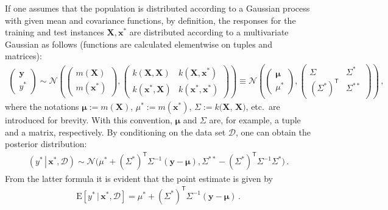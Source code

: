\documentclass[smallcondensed]{svjour3}
\begin{document}
    If one assumes that the population is distributed according to a Gaussian process with given mean and covariance functions, by definition, the responses for the training and test instances $\mathbf{X},\mathbf{x}^*$ are distributed according to a multivariate Gaussian as follows (functions are calculated elementwise on tuples and matrices):
    \begin{gather}
        \begin{pmatrix}
            \mathbf{y}\\
            y^*
        \end{pmatrix} \sim
        \mathcal{N}\left(
        \begin{pmatrix}
            m(\mathbf{X})\\
            m(\mathbf{x}^*)
        \end{pmatrix},
        \begin{pmatrix}
            k(\mathbf{X},\mathbf{X})&k(\mathbf{X},\mathbf{x}^*)\\
            k(\mathbf{x}^*,\mathbf{X})&k(\mathbf{x}^*,\mathbf{x}^*)
        \end{pmatrix}
        \right)\equiv
        \mathcal{N}\left(
            \begin{pmatrix}
            \boldsymbol{\mu}\\
            \mu^*
        \end{pmatrix},
        \begin{pmatrix}
            \Sigma&\Sigma^*\\
            (\Sigma^*)^\mathsf{T}&\Sigma^{**}
        \end{pmatrix}
        \right)\,,
    \end{gather}
    where the notations $\boldsymbol{\mu} := m(\mathbf{X})$, $\mu^* := m(\mathbf{x}^*)$, $\Sigma := k(\mathbf{X}$, $\mathbf{X})$, etc.\ are introduced for brevity. With this convention, $\boldsymbol{\mu}$ and $\Sigma$ are, for example, a tuple and a matrix, respectively. By conditioning on the data set $\mathcal{D}$, one can obtain the posterior distribution:
    \begin{gather}
        \left.\left(y^*\,\right|\,\mathbf{x}^*,\mathcal{D}\right)\sim\mathcal{N}\Big(\mu^* + (\Sigma^*)^\mathsf{T}\Sigma^{-1}(\mathbf{y}-\boldsymbol{\mu}),\Sigma^{**} - (\Sigma^*)^\mathsf{T}\Sigma^{-1}\Sigma^*\Big)\,.
    \end{gather}
    From the latter formula it is evident that the point estimate is given by
    \begin{gather}
        \mathrm{E}[y^*\,|\,\mathbf{x}^*,\mathcal{D}] = \mu^* + (\Sigma^*)^\mathsf{T}\Sigma^{-1}(\mathbf{y} - \boldsymbol{\mu})\,.
    \end{gather}
\end{document}
